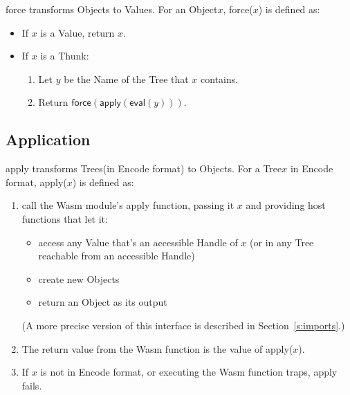 \documentclass{article}
\newcommand{\valuex}{\textrm{Value}\xspace}
\newcommand{\valuexs}{\textrm{Value}s\xspace}
\newcommand{\object}{\textrm{Object}\xspace}
\newcommand{\objects}{\textrm{Object}s\xspace}
\newcommand{\encode}{\textrm{Encode}\xspace}
\newcommand{\thunk}{\textrm{Thunk}\xspace}
\newcommand{\name}{\textrm{Name}\xspace}
\newcommand{\tree}{\textrm{Tree}\xspace}
\newcommand{\trees}{\textrm{Tree}s\xspace}
\newcommand{\handle}{\textrm{Handle}\xspace}
\newcommand{\eval}{\textsf{eval}}
\newcommand{\apply}{\textsf{apply}}
\newcommand{\force}{\textsf{force}}
\begin{document}
\force{} transforms \objects to \valuexs.  For an \object $x$, \force($x$) is defined as:
\begin{itemize}[itemsep=0pt]
\item If $x$ is a \valuex, return $x$.

\item If $x$ is a \thunk:
  \begin{enumerate}[topsep=0pt,itemsep=0pt]
  \item Let $y$ be the \name of the \tree that $x$ contains.
  \item Return $\force(\apply(\eval(y)))$.
  \end{enumerate}
\end{itemize}

\subsection{Application}

\apply{} transforms \trees (in \encode format) to \objects. For a \tree $x$ in \encode format, \apply($x$) is defined as:

\begin{enumerate}[itemsep=0pt]
\item call the Wasm module's apply function, passing it $x$ and providing host functions that let it:
  \begin{itemize}[topsep=0pt, itemsep=0pt]
  \item access any \valuex that's an accessible \handle of $x$ (or in any \tree reachable from an accessible \handle)
  \item create new \objects
  \item return an \object as its output
  \end{itemize}
  (A more precise version of this interface is described in Section~\ref{s:imports}.)
\item The return value from the Wasm function is the value of \apply($x$).
\item If $x$ is not in \encode format, or executing the Wasm function traps, \apply{} fails.
\end{enumerate}
      
\end{document}
